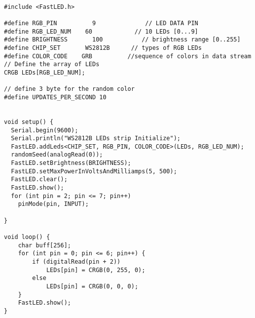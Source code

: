 \documentclass{standalone}
\begin{document}
\begin{verbatim}

#include <FastLED.h>

#define RGB_PIN        	 9              // LED DATA PIN
#define RGB_LED_NUM    60            // 10 LEDs [0...9]
#define BRIGHTNESS       100           // brightness range [0..255]
#define CHIP_SET       WS2812B      // types of RGB LEDs
#define COLOR_CODE    GRB          //sequence of colors in data stream
// Define the array of LEDs
CRGB LEDs[RGB_LED_NUM];

// define 3 byte for the random color
#define UPDATES_PER_SECOND 10


void setup() {
  Serial.begin(9600);
  Serial.println("WS2812B LEDs strip Initialize");
  FastLED.addLeds<CHIP_SET, RGB_PIN, COLOR_CODE>(LEDs, RGB_LED_NUM);
  randomSeed(analogRead(0));
  FastLED.setBrightness(BRIGHTNESS);
  FastLED.setMaxPowerInVoltsAndMilliamps(5, 500);
  FastLED.clear();
  FastLED.show();
  for (int pin = 2; pin <= 7; pin++)
    pinMode(pin, INPUT);

}

void loop() {
    char buff[256];
    for (int pin = 0; pin <= 6; pin++) {
        if (digitalRead(pin + 2))
            LEDs[pin] = CRGB(0, 255, 0);
        else
            LEDs[pin] = CRGB(0, 0, 0);
    }
    FastLED.show();
}
\end{verbatim}
\end{document}
